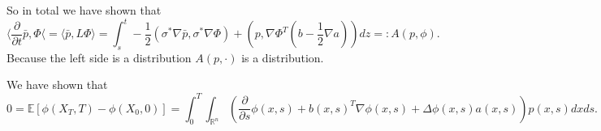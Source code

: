 \documentclass[a4paper,12pt,twoside]{article}
\begin{document}
So in total we have shown that 
\[
\langle \frac{\partial}{\partial t} \bar{p}, \Phi \langle = \langle \bar{p}, L \Phi \rangle = \int_s^t - \frac{1}{2} (\sigma^* \nabla \bar{p}, \sigma^* \nabla \Phi)+ (p,\nabla \Phi^T (b-\frac{1}{2} \nabla a))dz =: A(p,\phi).
\]
Because the left side is a distribution $A (p,\cdot)$ is a distribution.








We have shown that 
\[
0= \mathbb{E}[ \phi(X_T,T) - \phi (X_0,0) ] = \int_0^T \int_{\mathbb{R}^n} ( \frac{\partial}{\partial s} \phi (x,s) + b(x,s)^T \nabla \phi (x,s) + \Delta \phi (x,s) a(x,s) ) p(x,s) dx ds.
\]

\thm{}{
    Under \ref{Assumption: A} $(\bar{X}_t)_{t \in [0,1)}$ is a Markov diffusion process wrt. $\bar{L}_t$.
}
\end{document}
